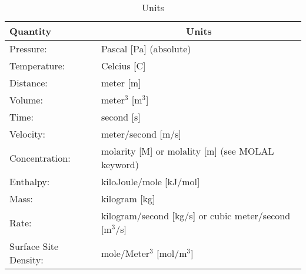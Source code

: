 \begin{table}[h]\centering
\caption{Units}\label{tunits}

\vspace{3mm}

\begin{tabular}{ll}
\toprule[2pt]
Quantity & \multicolumn{1}{c}{Units}\\
\midrule[1pt]
Pressure: & Pascal [Pa] (absolute)\\
Temperature: & Celcius [C]\\
Distance: & meter [m]\\
Volume: & meter$^3$ [m$^3$]\\
Time: & second [s]\\
Velocity: & meter/second [m/s]\\
Concentration: & molarity [M] or molality [m] (see MOLAL keyword)\\
Enthalpy: & kiloJoule/mole [kJ/mol]\\
Mass: & kilogram [kg]\\
Rate: & kilogram/second [kg/s] or cubic meter/second [m$^3$/s]\\
Surface Site Density: & mole/Meter$^{3}$ [mol/m$^{3}$]\\
\bottomrule[1.5pt]
\end{tabular}
\end{table}

\begin{comment}
\begin{verbatim}
\protect\hypertarget{target_XXX}{}
\subsection{Keyword: XXX}
{\noindent\bf Description:}
{\noindent\bf Input:}
\begin{deflist}{0000000000}
\item[]
\end{deflist}
{\noindent\bf Explanation:}
\begin{description}
\item[Keyword XXX]
\end{description}
{\noindent\bf Examples:}
\end{verbatim}
\end{comment}

